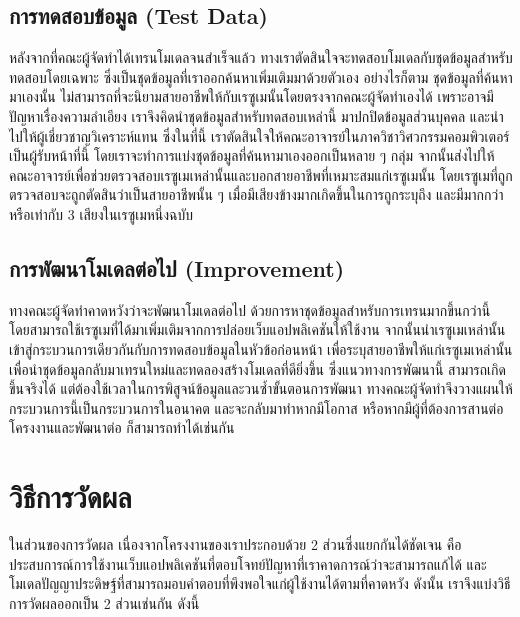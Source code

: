 \subsection{การทดสอบข้อมูล (Test Data)}
\label{subsec:Test Data}
หลังจากที่คณะผู้จัดทำได้เทรนโมเดลจนสำเร็จแล้ว ทางเราตัดสินใจจะทดสอบโมเดลกับชุดข้อมูลสำหรับทดสอบโดยเฉพาะ ซึ่งเป็นชุดข้อมูลที่เราออกค้นหาเพิ่มเติมมาด้วยตัวเอง
อย่างไรก็ตาม ชุดข้อมูลที่ค้นหามาเองนั้น ไม่สามารถที่จะนิยามสายอาชีพให้กับเรซูเมนั้นโดยตรงจากคณะผู้จัดทำเองได้ เพราะอาจมีปัญหาเรื่องความลำเอียง
เราจึงคิดนำชุดข้อมูลสำหรับทดสอบเหล่านี้ มาปกปิดข้อมูลส่วนบุคคล และนำไปให้ผู้เชี่ยวชาญวิเคราะห์แทน ซึ่งในที่นี้ เราตัดสินใจให้คณะอาจารย์ในภาควิชาวิศวกรรมคอมพิวเตอร์เป็นผู้รับหน้าที่นี้
โดยเราจะทำการแบ่งชุดข้อมูลที่ค้นหามาเองออกเป็นหลาย ๆ กลุ่ม จากนั้นส่งไปให้คณะอาจารย์เพื่อช่วยตรวจสอบเรซูเมเหล่านั้นและบอกสายอาชีพที่เหมาะสมแก่เรซูเมนั้น
โดยเรซูเมที่ถูกตรวจสอบจะถูกตัดสินว่าเป็นสายอาชีพนั้น ๆ เมื่อมีเสียงข้างมากเกิดขึ้นในการถูกระบุถึง และมีมากกว่าหรือเท่ากับ 3 เสียงในเรซูเมหนึ่งฉบับ

\subsection{การพัฒนาโมเดลต่อไป (Improvement)}
\label{subsec:Improvement Model}
ทางคณะผู้จัดทำคาดหวังว่าจะพัฒนาโมเดลต่อไป ด้วยการหาชุดข้อมูลสำหรับการเทรนมากขึ้นกว่านี้ โดยสามารถใช้เรซูเมที่ได้มาเพิ่มเติมจากการปล่อยเว็บแอปพลิเคชันให้ใช้งาน
จากนั้นนำเรซูเมเหล่านั้นเข้าสู่กระบวนการเดียวกันกับการทดสอบข้อมูลในหัวข้อก่อนหน้า เพื่อระบุสายอาชีพให้แก่เรซูเมเหล่านั้น เพื่อนำชุดข้อมูลกลับมาเทรนใหม่และทดลองสร้างโมเดลที่ดียิ่งขึ้น
ซึ่งแนวทางการพัฒนานี้ สามารถเกิดขึ้นจริงได้ แต่ต้องใช้เวลาในการพิสูจน์ข้อมูลและวนซ้ำขั้นตอนการพัฒนา ทางคณะผู้จัดทำจึงวางแผนให้กระบวนการนี้เป็นกระบวนการในอนาคต และจะกลับมาทำหากมีโอกาส
หรือหากมีผู้ที่ต้องการสานต่อโครงงานและพัฒนาต่อ ก็สามารถทำได้เช่นกัน


\section{วิธีการวัดผล}
ในส่วนของการวัดผล เนื่องจากโครงงานของเราประกอบด้วย 2 ส่วนซึ่งแยกกันได้ชัดเจน คือ ประสบการณ์การใช้งานเว็บแอปพลิเคชันที่ตอบโจทย์ปัญหาที่เราคาดการณ์ว่าจะสามารถแก้ได้
และโมเดลปัญญาประดิษฐ์ที่สามารถมอบคำตอบที่พึงพอใจแก่ผู้ใช้งานได้ตามที่คาดหวัง ดังนั้น เราจึงแบ่งวิธีการวัดผลออกเป็น 2 ส่วนเช่นกัน ดังนี้

